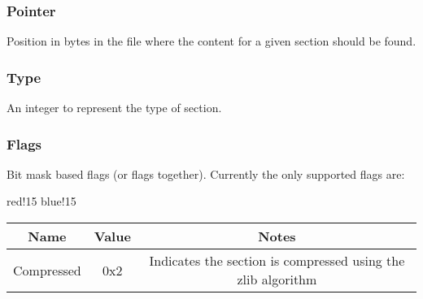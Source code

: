 \subsubsection{Pointer}
Position in bytes in the file where the content for a given section should be found.

\subsubsection{Type}
An integer to represent the type of section.

\subsubsection{Flags}
Bit mask based flags (or flags together). Currently the only supported flags are:
\begin{center}
    {
        {red!15}
        {blue!15}
        \begin{tabular}{|c|c|c|}
            \hline
            \textbf{Name} & \textbf{Value} & \textbf{Notes} \\
    
            \hline\hline
            Compressed & 0x2 & Indicates the section is compressed using the zlib \cite{zlib} algorithm \\
            \hline
        \end{tabular}
    }
\end{center}